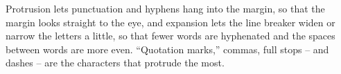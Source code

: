\documentclass{article}
\begin{document}
Protrusion lets punctuation and hyphens hang into the margin, so that the
margin looks straight to the eye, and expansion lets the line breaker widen
or narrow the letters a little, so that fewer words are hyphenated and the
spaces between words are more even. ``Quotation marks,'' commas, full
stops -- and dashes -- are the characters that protrude the most.
\end{document}
